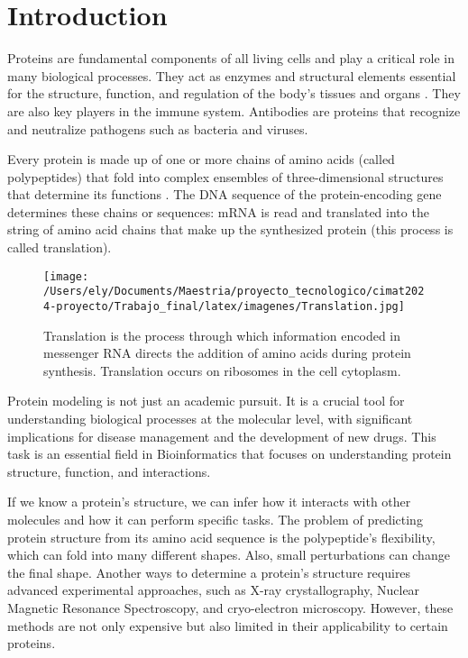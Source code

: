 \documentclass[letterpaper,spanish,reprint,nofootinbib,showkeys,aps]{revtex4-2}
\begin{document}
\section{Introduction}




Proteins are fundamental components of all living cells and play a critical role in many biological processes. They act as enzymes and structural elements essential for the structure, function, and regulation of the body's tissues and organs \cite{genomeglossary_protein} . They are also key players in the immune system. Antibodies are proteins that recognize and neutralize pathogens such as bacteria and viruses.\cite{hu2024survey} 


Every protein is made up of one or more chains of amino acids (called polypeptides)  that fold into complex ensembles of three-dimensional structures that determine its functions \cite{genomeglossary_protein}.  The DNA sequence of the protein-encoding gene determines these chains or sequences: mRNA is read and translated into the string of amino acid chains that make up the synthesized protein (this process is called translation). \cite{genomeglossary_translation} 


\begin{figure} [H]
	\begin{center}
		\texttt{[image: /Users/ely/Documents/Maestria/proyecto\_tecnologico/cimat2024-proyecto/Trabajo\_final/latex/imagenes/Translation.jpg]}
		\caption{Translation is the process through which information encoded in messenger RNA directs the addition of amino acids during protein synthesis. Translation occurs on ribosomes in the cell cytoplasm. \cite{genomeglossary_translation}}
   \end{center} 
\end{figure}


Protein modeling is not just an academic pursuit. It is a crucial tool for understanding biological processes at the molecular level, with significant implications for disease management and the development of new drugs. This task is an essential field in Bioinformatics that focuses on understanding protein structure, function, and interactions. 

If we know a protein's structure, we can infer how it interacts with other molecules and how it can perform specific tasks. The problem of predicting protein structure from its amino acid sequence is the polypeptide's flexibility, which can fold into many different shapes. Also, small perturbations can change the final shape.
Another ways to determine a protein's structure requires advanced experimental approaches, such as X-ray crystallography, Nuclear Magnetic Resonance Spectroscopy, and cryo-electron microscopy. However, these methods are not only expensive but also limited in their applicability to certain proteins.
\end{document}
